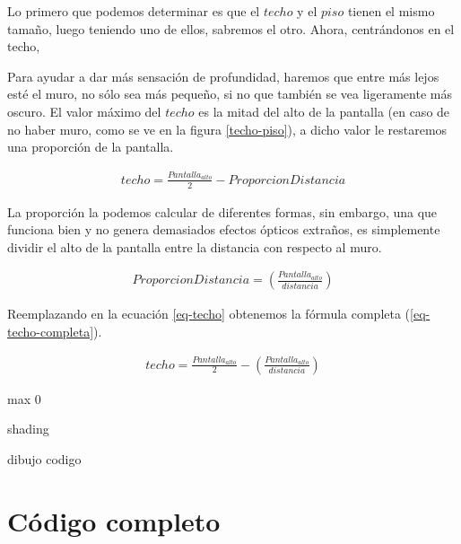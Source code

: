 Lo primero que podemos determinar es que el $techo$ y el $piso$ tienen el mismo tamaño, luego teniendo uno de ellos, sabremos el otro. Ahora, centrándonos en el techo, 


Para ayudar a dar más sensación de profundidad, haremos que entre más lejos esté el muro, no sólo sea más pequeño, si no que también se vea ligeramente más oscuro. El valor máximo del $techo$ es la mitad del alto de la pantalla (en caso de no haber muro, como se ve en la figura \ref{techo-piso}), a dicho valor le restaremos una proporción de la pantalla.

\begin{equation}
\begin{aligned}
\label{eq-techo}
techo = \frac{Pantalla_{alto}}{2} - ProporcionDistancia
\end{aligned}
\end{equation}

La proporción la podemos calcular de diferentes formas, sin embargo, una que funciona bien y no genera demasiados efectos ópticos extraños, es simplemente dividir el alto de la pantalla entre la distancia con respecto al muro. 

\begin{equation}
\begin{aligned}
\label{eq-propdist}
ProporcionDistancia = \left(\frac{Pantalla_{alto}}{distancia}\right)
\end{aligned}
\end{equation}

Reemplazando en la ecuación \ref{eq-techo} obtenemos la fórmula completa (\ref{eq-techo-completa}).

\begin{equation}
\begin{aligned}
\label{eq-techo-completa}
techo = \frac{Pantalla_{alto}}{2} - \left(\frac{Pantalla_{alto}}{distancia}\right)
\end{aligned}
\end{equation}

max 0

shading

dibujo codigo

\section{Código completo}